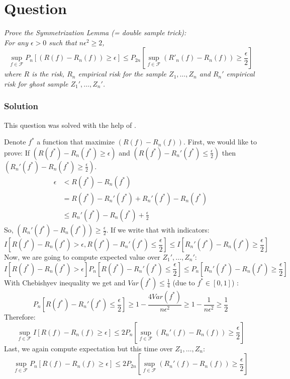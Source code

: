 \documentclass{article}
\newcounter{counterquestion}
\newenvironment{question}[1]
{
\stepcounter{counterquestion}
\section*{Question \thecounterquestion}
\emph{#1} 
} 
{
}
\newenvironment{solution}
{
\subsubsection*{Solution}
} 
{
}
\begin{document}
\begin{question}{Prove the Symmetrization Lemma (= double sample trick): \\
For any $\epsilon > 0$ such that $n\epsilon^2 \geq 2$, 
\[
\sup_{f \in \mathcal{F}} P_n \left[  (R(f) - R_n(f)) \geq \epsilon \right] \leq P_{2n} \left[ \sup_{f \in \mathcal{F}} (R'_n(f) - R_n(f)) \geq \frac{\epsilon}{2} \right]
\]
where $R$ is the risk, $R_n$ empirical risk for the sample $Z_1, \dots, Z_n$ and $R_n'$ empirical risk for ghost sample $Z_1', \dots, Z_n'$.}
\begin{solution}
This question was solved with the help of \cite{question3}.

Denote $f^*$ a function that maximize $(R(f) - R_n(f))$. First, we would like to prove: If $(R(f^*) - R_n(f^*) \geq \epsilon)$ and $(R(f^*) - R_n'(f^*) \leq \frac{\epsilon}{2})$ then $(R_n'(f^*) - R_n(f^*) \geq \frac{\epsilon}{2})$.
\begin{align*}
\epsilon & < R(f^*) - R_n(f^*) \\
& = R(f^*) - R_n'(f^*) + R_n'(f^*) - R_n(f^*) \\
& \leq R_n'(f^*) - R_n(f^*) + \frac{\epsilon}{2}
\end{align*}
So, $(R_n'(f^*) - R_n(f^*)) \geq \frac{\epsilon}{2}$. If we write that with indicators:
\[
I \left[ R(f^*) - R_n(f^*) > \epsilon, R(f^*) - R_n'(f^*) \leq \frac{\epsilon}{2} \right] \leq I \left[ R_n'(f^*) - R_n(f^*) \geq \frac{\epsilon}{2} \right]
\]
Now, we are going to compute expected value over $Z_1', \dots, Z_n'$:
\[
I \left[ R(f^*) - R_n(f^*) > \epsilon \right] P_n \left[ R(f^*) - R_n'(f^*) \leq \frac{\epsilon}{2} \right] \leq P_n \left[ R_n'(f^*) - R_n(f^*) \geq \frac{\epsilon}{2} \right]
\]
With Chebishyev inequality we get and $Var(f^*) \leq \frac{1}{4}$ (due to $f^* \in [0, 1]$) :
\[
P_n \left[ R(f^*) - R_n'(f^*) \leq \frac{\epsilon}{2} \right] \geq 1- \frac{4 Var(f^*)}{n\epsilon^2} \geq 1 - \frac{1}{n\epsilon^2} \geq \frac{1}{2}
\]
Therefore:
\[
\sup_{f \in \mathcal{F}} I \left[ R(f) - R_n(f) \geq \epsilon \right]  \leq 2 P_n \left[ \sup_{f \in \mathcal{F}}(R_n'(f) - R_n(f)) \geq \frac{\epsilon}{2} \right]
\]
Last, we again compute expectation but this time over $Z_1, \dots, Z_n$:
\[
\sup_{f \in \mathcal{F}} P_n \left[ R(f) - R_n(f) \geq \epsilon \right]  \leq 2 P_{2n} \left[ \sup_{f \in \mathcal{F}}(R_n'(f) - R_n(f)) \geq \frac{\epsilon}{2} \right]
\]
\end{solution}
\end{question}




\end{document}
